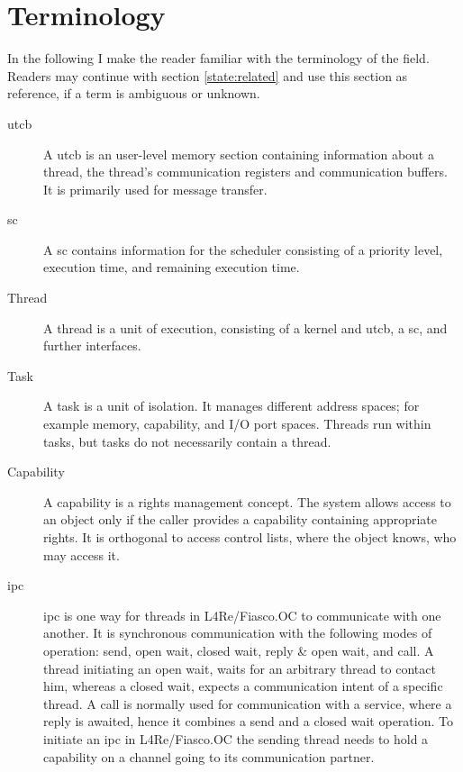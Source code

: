 \section{Terminology}
\label{state:term}

In the following I make the reader familiar with the terminology of the field.
Readers may continue with section \ref{state:related} and use this section
as reference, if a term is ambiguous or unknown.


\begin{description}
  \item[\Gls{utcb}] A \gls{utcb} is an user-level memory section containing
    information about a thread, the thread's communication registers and
    communication buffers. It is primarily used for message transfer.

  \item[\Gls{sc}] A \gls{sc} contains information for the scheduler consisting
    of a priority level, execution time, and remaining execution time.

  \item[Thread] A thread is a unit of execution, consisting of a kernel and
    \gls{utcb}, a \gls{sc}, and further interfaces.

  \item[Task] A task is a unit of isolation. It manages different address
    spaces; for example memory, capability, and I/O port spaces.
    Threads run within tasks, but tasks do not necessarily contain a thread.

  \item[Capability] A capability is a rights management concept.
    The system allows access to an object only if the caller provides a
    capability containing appropriate rights.
    It is orthogonal to access control lists, where the object knows, who may
    access it.

  \item[\Gls{ipc}] \Gls{ipc} is one way for threads in L4Re/Fiasco.OC
    to communicate with one another.
    It is synchronous communication with the following modes of operation:
    send, open wait, closed wait, reply \& open wait, and call.
    A thread initiating an open wait, waits for an arbitrary thread to contact
    him, whereas a closed wait, expects a communication intent of a specific
    thread.
    A call is normally used for communication with a service, where a reply is
    awaited, hence it combines a send and a closed wait operation.
    To initiate an \gls{ipc} in L4Re/Fiasco.OC the sending thread needs to hold
    a capability on a channel going to its communication partner.


\end{description}
